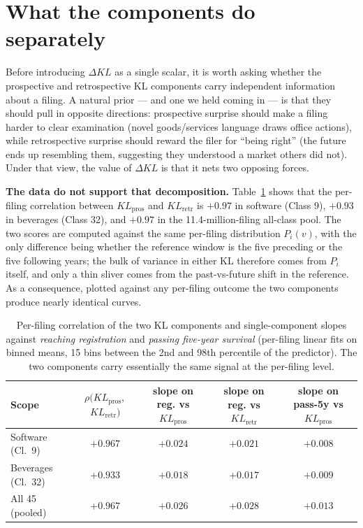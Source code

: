 \documentclass[11pt]{article}
\begin{document}
\section{What the components do separately}
\label{sec:components}

Before introducing $\Delta KL$ as a single scalar, it is worth asking
whether the prospective and retrospective KL components carry
independent information about a filing. A natural prior --- and one we
held coming in --- is that they should pull in opposite directions:
prospective surprise should make a filing harder to clear examination
(novel goods/services language draws office actions), while
retrospective surprise should reward the filer for ``being right'' (the
future ends up resembling them, suggesting they understood a market
others did not). Under that view, the value of $\Delta KL$ is that it
nets two opposing forces.

\textbf{The data do not support that decomposition.} Table~\ref{tab:components}
shows that the per-filing correlation between $KL_{\text{pros}}$ and
$KL_{\text{retr}}$ is $+0.97$ in software (Class 9), $+0.93$ in beverages
(Class 32), and $+0.97$ in the 11.4-million-filing all-class pool. The
two scores are computed against the same per-filing distribution
$P_i(v)$, with the only difference being whether the reference window
is the five preceding or the five following years; the bulk of variance
in either KL therefore comes from $P_i$ itself, and only a thin sliver
comes from the past-vs-future shift in the reference. As a consequence,
plotted against any per-filing outcome the two components produce
nearly identical curves.

\begin{table}[h]
\centering
\caption{Per-filing correlation of the two KL components and
single-component slopes against \emph{reaching registration} and
\emph{passing five-year survival} (per-filing linear fits on binned
means, 15 bins between the 2nd and 98th percentile of the predictor).
The two components carry essentially the same signal at the per-filing
level.}
\label{tab:components}
\begin{tabular}{lcccc}
\toprule
Scope & \shortstack{$\rho(KL_{\text{pros}},$\\ $KL_{\text{retr}})$} & \shortstack{slope on reg.\\ vs $KL_{\text{pros}}$} & \shortstack{slope on reg.\\ vs $KL_{\text{retr}}$} & \shortstack{slope on pass-5y\\ vs $KL_{\text{pros}}$} \\
\midrule
Software (Cl.\ 9)   & $+0.967$ & $+0.024$ & $+0.021$ & $+0.008$ \\
Beverages (Cl.\ 32) & $+0.933$ & $+0.018$ & $+0.017$ & $+0.009$ \\
All 45 (pooled)     & $+0.967$ & $+0.026$ & $+0.028$ & $+0.013$ \\
\bottomrule
\end{tabular}
\end{table}
\end{document}
